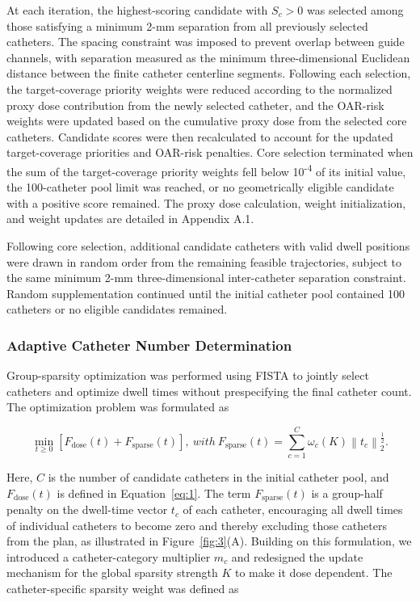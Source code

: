 \documentclass[12pt,twoside,letterpaper]{article}
\begin{document}
At each iteration, the highest-scoring candidate with $S_{c} > 0$ was selected among those satisfying a minimum 2-mm separation from all previously selected catheters. The spacing constraint was imposed to prevent overlap between guide channels, with separation measured as the minimum three-dimensional Euclidean distance between the finite catheter centerline segments. Following each selection, the target-coverage priority weights were reduced according to the normalized proxy dose contribution from the newly selected catheter, and the OAR-risk weights were updated based on the cumulative proxy dose from the selected core catheters. Candidate scores were then recalculated to account for the updated target-coverage priorities and OAR-risk penalties. Core selection terminated when the sum of the target-coverage priority weights fell below 10\textsuperscript{-4} of its initial value, the 100-catheter pool limit was reached, or no geometrically eligible candidate with a positive score remained. The proxy dose calculation, weight initialization, and weight updates are detailed in Appendix A.1.

Following core selection, additional candidate catheters with valid dwell positions were drawn in random order from the remaining feasible trajectories, subject to the same minimum 2-mm three-dimensional inter-catheter separation constraint. Random supplementation continued until the initial catheter pool contained 100 catheters or no eligible candidates remained.

\subsubsection{Adaptive Catheter Number Determination}\label{sec:2-2-2}

Group-sparsity optimization was performed using FISTA\cite{ref70,ref71} to jointly select catheters and optimize dwell times without prespecifying the final catheter count. The optimization problem was formulated as

\begin{equation}\label{eq:4}
\min_{t \geq 0}\left\lbrack F_{\text{dose}}\left( t \right) + F_{\text{sparse}}\left( t \right) \right\rbrack,\ with\ F_{\text{sparse}}\left( t \right) = \sum_{c = 1}^{C}{\omega_{c}(K)\left\| t_{c} \right\|_{2}^{\frac{1}{2}}}.
\end{equation}

Here, $C$ is the number of candidate catheters in the initial catheter pool, and $F_{\text{dose}}\left( t \right)$ is defined in Equation~\eqref{eq:1}. The term $F_{\text{sparse}}\left( t \right)$ is a group-half penalty on the dwell-time vector $t_{c}$ of each catheter, encouraging all dwell times of individual catheters to become zero and thereby excluding those catheters from the plan, as illustrated in Figure~\ref{fig:3}(A).\cite{ref71} Building on this formulation, we introduced a catheter-category multiplier $m_{c}$ and redesigned the update mechanism for the global sparsity strength $K$ to make it dose dependent. The catheter-specific sparsity weight was defined as
\end{document}

